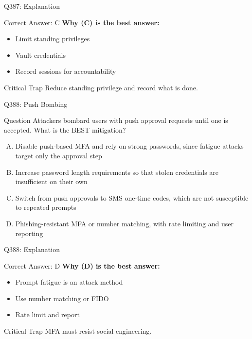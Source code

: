 \documentclass{beamer}
\begin{document}
	\begin{frame}{Q387: Explanation}
		\begin{block}{Correct Answer: C}
			\textbf{Why (C) is the best answer:}
			\begin{itemize}
				\item Limit standing privileges
				\item Vault credentials
				\item Record sessions for accountability
			\end{itemize}
		\end{block}
		\begin{alertblock}{Critical Trap}
			Reduce standing privilege and record what is done.
		\end{alertblock}
	\end{frame}
	
	\begin{frame}{Q388: Push Bombing}
		\begin{block}{Question}
			\small Attackers bombard users with push approval requests until one is accepted. What is the BEST mitigation?
		\end{block}
		\begin{enumerate}[(A)]
			\footnotesize
			\item Disable push-based MFA and rely on strong passwords, since fatigue attacks target only the approval step
			\item Increase password length requirements so that stolen credentials are insufficient on their own
			\item Switch from push approvals to SMS one-time codes, which are not susceptible to repeated prompts
			\item Phishing-resistant MFA or number matching, with rate limiting and user reporting
		\end{enumerate}
	\end{frame}
	
	\begin{frame}{Q388: Explanation}
		\begin{block}{Correct Answer: D}
			\textbf{Why (D) is the best answer:}
			\begin{itemize}
				\item Prompt fatigue is an attack method
				\item Use number matching or FIDO
				\item Rate limit and report
			\end{itemize}
		\end{block}
		\begin{alertblock}{Critical Trap}
			MFA must resist social engineering.
		\end{alertblock}
	\end{frame}
	
\end{document}
